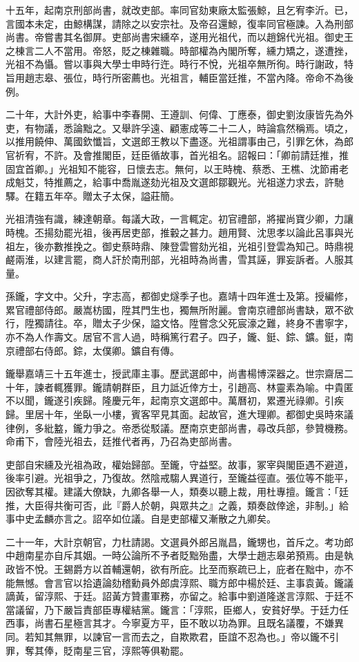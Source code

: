 \begin{pinyinscope}
十五年，起南京刑部尚書，就改吏部。率同官劾東廠太監張鯨，且乞宥李沂。已，言國本未定，由鯨構謀，請除之以安宗社。及帝召還鯨，復率同官極諫。入為刑部尚書。帝嘗書其名御屏。吏部尚書宋纁卒，遂用光祖代，而以趙錦代光祖。御史王之棟言二人不當用。帝怒，貶之棟雜職。時部權為內閣所奪，纁力矯之，遂遭挫，光祖不為懾。嘗以事與大學士申時行迕。時行不悅，光祖卒無所徇。時行謝政，特旨用趙志皋、張位，時行所密薦也。光祖言，輔臣當廷推，不當內降。帝命不為後例。

二十年，大計外吏，給事中李春開、王遵訓、何偉、丁應泰，御史劉汝康皆先為外吏，有物議，悉論黜之。又舉許孚遠、顧憲成等二十二人，時論翕然稱焉。頃之，以推用饒伸、萬國欽懺旨，文選郎王教以下盡逐。光祖謂事由己，引罪乞休，為郎官祈宥，不許。及會推閣臣，廷臣循故事，首光祖名。詔報曰：「卿前請廷推，推固宜首卿。」光祖知不能容，日懷去志。無何，以王時槐、蔡悉、王樵、沈節甫老成魁艾，特推薦之，給事中喬胤遂劾光祖及文選郎鄒觀光。光祖遂力求去，許馳驛。在籍五年卒。贈太子太保，謚莊簡。

光祖清強有識，練達朝章。每議大政，一言輒定。初官禮部，將擢尚寶少卿，力讓時槐。丕揚劾罷光祖，後再居吏部，推轂之甚力。趙用賢、沈思孝以論此呂事與光祖左，後亦數推挽之。御史蔡時鼎、陳登雲嘗劾光祖，光祖引登雲為知己。時鼎視鹺兩淮，以建言罷，商人訐於南刑部，光祖時為尚書，雪其誣，罪妄訴者。人服其量。

孫鑨，字文中。父升，字志高，都御史燧季子也。嘉靖十四年進士及第。授編修，累官禮部侍郎。嚴嵩枋國，陞其門生也，獨無所附麗。會南京禮部尚書缺，眾不欲行，陞獨請往。卒，贈太子少保，謚文恪。陞嘗念父死宸濠之難，終身不書寧字，亦不為人作壽文。居官不言人過，時稱篤行君子。四子，鑨、鋌、錝、鑛。鋌，南京禮部右侍郎。錝，太僕卿。鑛自有傳。

鑨舉嘉靖三十五年進士，授武庫主事。歷武選郎中，尚書楊博深器之。世宗齋居二十年，諫者輒獲罪。鑨請朝群臣，且力詆近倖方士，引趙高、林靈素為喻。中貴匿不以聞，鑨遂引疾歸。隆慶元年，起南京文選郎中。萬曆初，累遷光祿卿。引疾歸。里居十年，坐臥一小樓，賓客罕見其面。起故官，進大理卿。都御史吳時來議律例，多紕盭，鑨力爭之。帝悉從駁議。歷南京吏部尚書，尋改兵部，參贊機務。命甫下，會陸光祖去，廷推代者再，乃召為吏部尚書。

吏部自宋纁及光祖為政，權始歸部。至鑨，守益堅。故事，冢宰與閣臣遇不避道，後率引避。光祖爭之，乃復故。然陰戒騶人異道行，至鑨益徑直。張位等不能平，因欲奪其權。建議大僚缺，九卿各舉一人，類奏以聽上裁，用杜專擅。鑨言：「廷推，大臣得共衡可否，此『爵人於朝，與眾共之』之義，類奏啟倖途，非制。」給事中史孟麟亦言之。詔卒如位議。自是吏部權又漸散之九卿矣。

二十一年，大計京朝官，力杜請謁。文選員外郎呂胤昌，鑨甥也，首斥之。考功郎中趙南星亦自斥其姻。一時公論所不予者貶黜殆盡，大學士趙志皋弟預焉。由是執政皆不悅。王錫爵方以首輔還朝，欲有所庇。比至而察疏已上，庇者在黜中，亦不能無憾。會言官以拾遺論劾稽勳員外郎虞淳熙、職方郎中楊於廷、主事袁黃。鑨議謫黃，留淳熙、于廷。詔黃方贊畫軍務，亦留之。給事中劉道隆遂言淳熙、于廷不當議留，乃下嚴旨責部臣專權結黨。鑨言：「淳熙，臣鄉人，安貧好學。于廷力任西事，尚書石星極言其才。今寧夏方平，臣不敢以功為罪。且既名議覆，不嫌異同。若知其無罪，以諫官一言而去之，自欺欺君，臣誼不忍為也。」帝以鑨不引罪，奪其俸，貶南星三官，淳熙等俱勒罷。


\end{pinyinscope}
